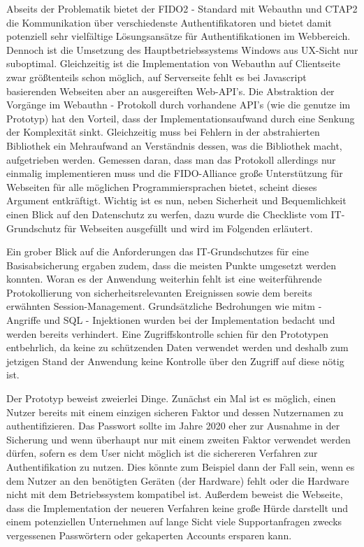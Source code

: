 Abseits der Problematik bietet der FIDO2 - Standard mit Webauthn und CTAP2 die Kommunikation über verschiedenste Authentifikatoren und bietet damit potenziell sehr vielfältige Lösungsansätze für Authentifikationen im Webbereich.
Dennoch ist die Umsetzung des Hauptbetriebssystems Windows aus UX-Sicht nur suboptimal. Gleichzeitig ist die Implementation von Webauthn auf Clientseite zwar größtenteils schon möglich, auf Serverseite fehlt es bei Javascript basierenden Webseiten aber an ausgereiften Web-API's. Die Abstraktion der Vorgänge im Webauthn - Protokoll durch vorhandene API's (wie die genutze im Prototyp) hat den Vorteil, dass der Implementationsaufwand durch eine Senkung der Komplexität sinkt. Gleichzeitig muss bei Fehlern in der abstrahierten Bibliothek ein Mehraufwand an Verständnis dessen, was die Bibliothek macht, aufgetrieben werden. Gemessen daran, dass man das Protokoll allerdings nur einmalig implementieren muss und die FIDO-Alliance große Unterstützung für Webseiten für alle möglichen Programmiersprachen bietet, scheint dieses Argument entkräftigt. Wichtig ist es nun, neben Sicherheit und Bequemlichkeit einen Blick auf den Datenschutz zu werfen, dazu wurde die Checkliste vom IT-Grundschutz für Webseiten ausgefüllt und wird im Folgenden erläutert.



Ein grober Blick auf die Anforderungen das IT-Grundschutzes für eine Basisabsicherung ergaben zudem, dass die meisten Punkte umgesetzt werden konnten. Woran es der Anwendung weiterhin fehlt ist eine weiterführende Protokollierung von sicherheitsrelevanten Ereignissen sowie dem bereits erwähnten Session-Management. Grundsätzliche Bedrohungen wie \ac{mitm} - Angriffe und SQL - Injektionen wurden bei der Implementation bedacht und werden bereits verhindert. Eine Zugriffskontrolle schien für den Prototypen entbehrlich, da keine zu schützenden Daten verwendet werden und deshalb zum jetzigen Stand der Anwendung keine Kontrolle über den Zugriff auf diese nötig ist.

Der Prototyp beweist zweierlei Dinge. Zunächst ein Mal ist es möglich, einen Nutzer bereits mit einem einzigen sicheren Faktor und dessen Nutzernamen zu authentifizieren. Das Passwort sollte im Jahre 2020 eher zur Ausnahme in der Sicherung und wenn überhaupt nur mit einem zweiten Faktor verwendet werden dürfen, sofern es dem User nicht möglich ist die sichereren Verfahren zur Authentifikation zu nutzen. Dies könnte zum Beispiel dann der Fall sein, wenn es dem Nutzer an den benötigten Geräten (der Hardware) fehlt oder die Hardware nicht mit dem Betriebssystem kompatibel ist. Außerdem beweist die Webseite, dass die Implementation der neueren Verfahren keine große Hürde darstellt und einem potenziellen Unternehmen auf lange Sicht viele Supportanfragen zwecks vergessenen Passwörtern oder gekaperten Accounts ersparen kann.


